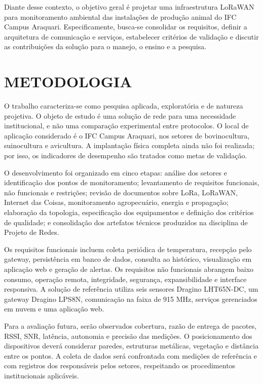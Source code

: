 \documentclass[12pt,a4paper]{article}
\begin{document}
Diante desse contexto, o objetivo geral é projetar uma infraestrutura LoRaWAN para monitoramento ambiental das instalações de produção animal do IFC Campus Araquari. Especificamente, busca-se consolidar os requisitos, definir a arquitetura de comunicação e serviços, estabelecer critérios de validação e discutir as contribuições da solução para o manejo, o ensino e a pesquisa.

\section{METODOLOGIA}

O trabalho caracteriza-se como pesquisa aplicada, exploratória e de natureza projetiva. O objeto de estudo é uma solução de rede para uma necessidade institucional, e não uma comparação experimental entre protocolos. O local de aplicação considerado é o IFC Campus Araquari, nos setores de bovinocultura, suinocultura e avicultura. A implantação física completa ainda não foi realizada; por isso, os indicadores de desempenho são tratados como metas de validação.

O desenvolvimento foi organizado em cinco etapas: análise dos setores e identificação dos pontos de monitoramento; levantamento de requisitos funcionais, não funcionais e restrições; revisão de documentos sobre LoRa, LoRaWAN, Internet das Coisas, monitoramento agropecuário, energia e propagação; elaboração da topologia, especificação dos equipamentos e definição dos critérios de qualidade; e consolidação dos artefatos técnicos produzidos na disciplina de Projeto de Redes.

Os requisitos funcionais incluem coleta periódica de temperatura, recepção pelo gateway, persistência em banco de dados, consulta ao histórico, visualização em aplicação web e geração de alertas. Os requisitos não funcionais abrangem baixo consumo, operação remota, integridade, segurança, expansibilidade e interface responsiva. A solução de referência utiliza seis sensores Dragino LHT65N-DC, um gateway Dragino LPS8N, comunicação na faixa de 915 MHz, serviços gerenciados em nuvem e uma aplicação web.

Para a avaliação futura, serão observados cobertura, razão de entrega de pacotes, RSSI, SNR, latência, autonomia e precisão das medições. O posicionamento dos dispositivos deverá considerar paredes, estruturas metálicas, vegetação e distância entre os pontos. A coleta de dados será confrontada com medições de referência e com registros dos responsáveis pelos setores, respeitando os procedimentos institucionais aplicáveis.
\end{document}
